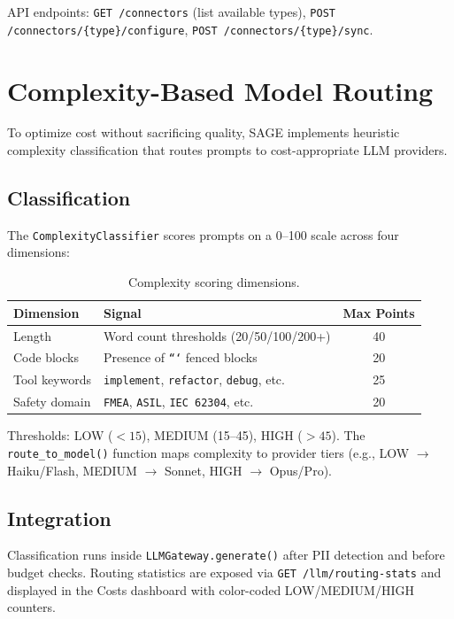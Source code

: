 \documentclass[11pt,a4paper]{article}
\begin{document}
API endpoints: \texttt{GET /connectors} (list available types), \texttt{POST /connectors/\{type\}/configure}, \texttt{POST /connectors/\{type\}/sync}.

\section{Complexity-Based Model Routing}
\label{sec:routing}

To optimize cost without sacrificing quality, SAGE implements heuristic complexity classification that routes prompts to cost-appropriate LLM providers.

\subsection{Classification}

The \texttt{ComplexityClassifier} scores prompts on a 0--100 scale across four dimensions:

\begin{table}[h]
\centering
\small
\caption{Complexity scoring dimensions.}
\label{tab:complexity}
\begin{tabular}{@{}llc@{}}
\toprule
\textbf{Dimension} & \textbf{Signal} & \textbf{Max Points} \\
\midrule
Length        & Word count thresholds (20/50/100/200+) & 40 \\
Code blocks  & Presence of \texttt{```} fenced blocks    & 20 \\
Tool keywords & \texttt{implement}, \texttt{refactor}, \texttt{debug}, etc. & 25 \\
Safety domain & \texttt{FMEA}, \texttt{ASIL}, \texttt{IEC 62304}, etc.      & 20 \\
\bottomrule
\end{tabular}
\end{table}

Thresholds: LOW ($<15$), MEDIUM (15--45), HIGH ($>45$). The \texttt{route\_to\_model()} function maps complexity to provider tiers (e.g., LOW $\rightarrow$ Haiku/Flash, MEDIUM $\rightarrow$ Sonnet, HIGH $\rightarrow$ Opus/Pro).

\subsection{Integration}

Classification runs inside \texttt{LLMGateway.generate()} after PII detection and before budget checks. Routing statistics are exposed via \texttt{GET /llm/routing-stats} and displayed in the Costs dashboard with color-coded LOW/MEDIUM/HIGH counters.
\end{document}
